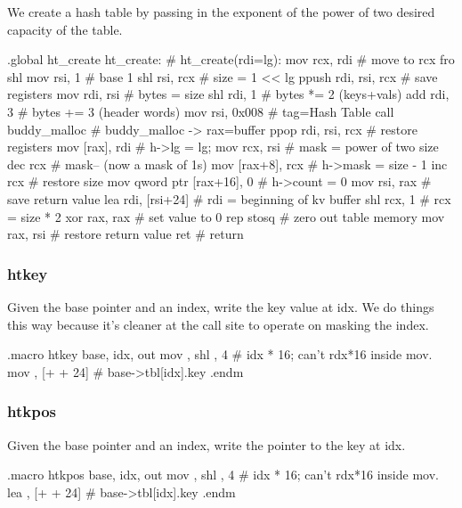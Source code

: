 We create a hash table by passing in the exponent of the power of two desired
capacity of the table.

\begin{asm}
.global ht_create
ht_create:				    # ht_create(rdi=lg):
	mov	rcx, rdi		    #   move to rcx fro shl
	mov	rsi, 1			    #   base 1
	shl	rsi, rcx		    #   size = 1 << lg
	ppush	rdi, rsi, rcx		    #   save registers
	mov	rdi, rsi		    #   bytes = size
	shl	rdi, 1			    #   bytes *= 2 (keys+vals)
	add	rdi, 3			    #   bytes += 3 (header words)
	mov	rsi, 0x008		    #   tag=Hash Table
	call	buddy_malloc		    #   buddy_malloc -> rax=buffer
	ppop	rdi, rsi, rcx		    #   restore registers
	mov	[rax], rdi		    #   h->lg = lg;
	mov	rcx, rsi		    #   mask = power of two size
	dec	rcx			    #   mask-- (now a mask of 1s)
	mov	[rax+8], rcx		    #   h->mask = size - 1
	inc	rcx			    #   restore size
	mov	qword ptr [rax+16], 0	    #   h->count = 0
	mov	rsi, rax		    #   save return value
	lea	rdi, [rsi+24]		    #   rdi = beginning of kv buffer
	shl	rcx, 1			    #   rcx = size * 2
	xor	rax, rax		    #   set value to 0
	rep	stosq			    #   zero out table memory
	mov	rax, rsi		    #   restore return value
	ret				    #   return
\end{asm}

\subsubsection{htkey}

Given the base pointer and an index, write the key value at idx. We do things
this way because it's cleaner at the call site to operate on masking the index.

\begin{asm}
.macro htkey base, idx, out
	mov	\out, \idx
	shl	\out, 4		# idx * 16; can't rdx*16 inside mov.
	mov	\out, [\base + \out + 24] # base->tbl[idx].key
.endm
\end{asm}

\subsubsection{htkpos}

Given the base pointer and an index, write the pointer to the key at idx.

\begin{asm}
.macro htkpos base, idx, out
	mov	\out, \idx
	shl	\out, 4		# idx * 16; can't rdx*16 inside mov.
	lea	\out, [\base + \out + 24] # base->tbl[idx].key
.endm
\end{asm}

